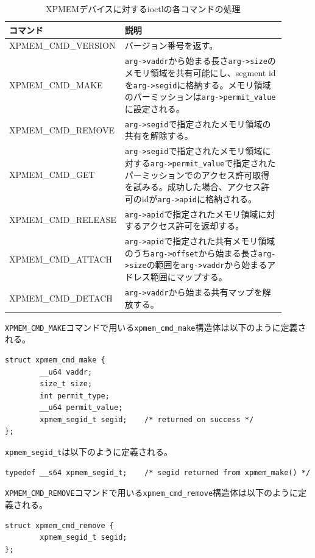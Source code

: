 \documentclass[twoside,11pt,fleqn]{book}
\begin{document}
\begin{table}[!htb]
  \caption{XPMEMデバイスに対するioctlの各コマンドの処理}\label{table:cmd}
  \footnotesize
  \begin{tabular}{|p{0.26\linewidth}|p{0.64\linewidth}|} \hline
    コマンド & 説明 \\ \hline
    XPMEM\_CMD\_VERSION & バージョン番号を返す。\\ \hline
    XPMEM\_CMD\_MAKE    & \texttt{arg->vaddr}から始まる長さ\texttt{arg->size}のメモリ領域を共有可能にし、segment idを\texttt{arg->segid}に格納する。メモリ領域のパーミッションは\texttt{arg->permit\_value}に設定される。\\ \hline
    XPMEM\_CMD\_REMOVE  & \texttt{arg->segid}で指定されたメモリ領域の共有を解除する。\\ \hline
    XPMEM\_CMD\_GET     & \texttt{arg->segid}で指定されたメモリ領域に対する\texttt{arg->permit\_value}で指定されたパーミッションでのアクセス許可取得を試みる。成功した場合、アクセス許可のidが\texttt{arg->apid}に格納される。\\ \hline
    XPMEM\_CMD\_RELEASE & \texttt{arg->apid}で指定されたメモリ領域に対するアクセス許可を返却する。\\ \hline
    XPMEM\_CMD\_ATTACH  & \texttt{arg->apid}で指定された共有メモリ領域のうち\texttt{arg->offset}から始まる長さ\texttt{arg->size}の範囲を\texttt{arg->vaddr}から始まるアドレス範囲にマップする。\\ \hline
    XPMEM\_CMD\_DETACH  &  \texttt{arg->vaddr}から始まる共有マップを解放する。\\ \hline
  \end{tabular}
  \normalsize
\end{table}
\FloatBarrier

\texttt{XPMEM\_CMD\_MAKE}コマンドで用いる\texttt{xpmem\_cmd\_make}構造体は以下のように定義される。
\begin{verbatim}
struct xpmem_cmd_make {
        __u64 vaddr;
        size_t size;
        int permit_type;
        __u64 permit_value;
        xpmem_segid_t segid;    /* returned on success */
};
\end{verbatim}

\texttt{xpmem\_segid\_t}は以下のように定義される。
\begin{verbatim}
typedef __s64 xpmem_segid_t;    /* segid returned from xpmem_make() */
\end{verbatim}

\texttt{XPMEM\_CMD\_REMOVE}コマンドで用いる\texttt{xpmem\_cmd\_remove}構造体は以下のように定義される。
\begin{verbatim}
struct xpmem_cmd_remove {
        xpmem_segid_t segid;
};
\end{verbatim}
\end{document}
